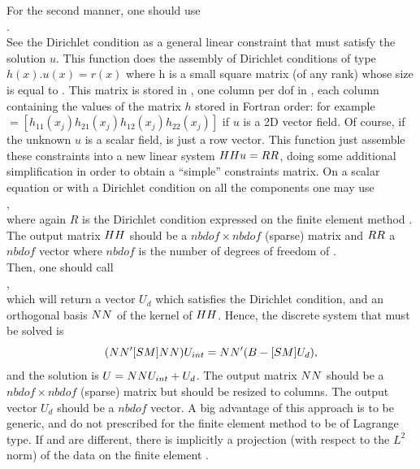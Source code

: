 \documentclass[11pt,a4paper]{article}
\begin{document}
For the second manner, one should use\\[0.5cm]
.\\[0.5cm]
See the Dirichlet condition as a general linear constraint that must
satisfy the solution $u$. This function does the assembly of 
Dirichlet conditions of type $h(x).u(x) = r(x)$ where h is a small square matrix
  (of any rank) whose size is equal to .
  This matrix is stored in , one column per dof in
  , each column containing the values of the matrix $h$ stored
  in Fortran order: for example $ = [h_{11}(x_j) h_{21}(x_j) h_{12}(x_j) h_{22}(x_j)]$ if $u$ is a 2D vector field.
  Of course, if the unknown $u$ is a scalar field,  is just a row vector.
This function just assemble these
constraints into a new linear system $HH u=RR$, doing some
additional simplification in order to obtain a ``simple'' constraints
matrix. On a scalar equation or with a Dirichlet condition on all the components one may use \\[0.5cm]
,\\[0.5cm]
where again $R$ is the Dirichlet condition expressed on the finite element method . The output matrix $HH$ should be a $nbdof \times nbdof$ (sparse) matrix and $RR$ a $nbdof$ vector where $nbdof$ is the number of degrees of freedom of .\\[0.5cm]

 Then, one should
call \\[0.5cm],\\[0.5cm] which will return a vector $U_d$ which
satisfies the Dirichlet condition, and an orthogonal basis $NN$ of the kernel of
$HH$. Hence, the discrete system that must be solved is
\begin{equation*} (NN'[SM]NN) U_{int}=NN'(B-[SM]U_d),\end{equation*}
and the solution is $U=NN U_{int}+U_d$.
The output matrix $NN$ should be a $nbdof \times nbdof$ (sparse) matrix but should be resized to  columns. The output vector $U_d$ should be a $nbdof$ vector.
A big advantage of this approach is to be generic, and do not prescribed for the finite element method  to be of Lagrange type. If  and 
 are different, there is implicitly a projection (with respect to the $L^2$ norm) of the data on the finite element .
\end{document}
